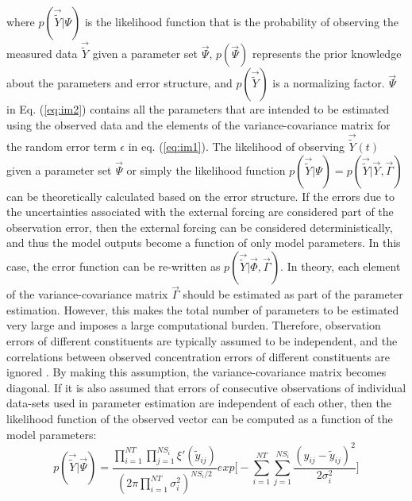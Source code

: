 where $p(\vec{\tilde Y}|\Psi)$ is the likelihood function that is the probability of observing the measured data $\vec{\tilde Y}$ given a parameter set $\vec{\Psi}$, $p(\vec{\Psi})$ represents the prior knowledge about the parameters and error structure, and $p(\vec{\tilde Y})$ is a normalizing factor. $\vec{\Psi}$ in Eq. (\ref{eq:im2}) contains all the parameters that are intended to be estimated using the observed data and the elements of the variance-covariance matrix for the random error term $\epsilon$ in eq. (\ref{eq:im1}). The likelihood of observing $\vec{\tilde Y}(t)$ given a parameter set $\vec{\Psi}$ or simply the likelihood function $p(\vec{\tilde Y}|\Psi) = p(\vec{\tilde Y}|\vec{Y},\vec{\Gamma})$ can be theoretically calculated based on the error structure. If the errors due to the uncertainties associated with the external forcing are considered part of the observation error, then the external forcing can be considered deterministically, and thus the model outputs become a function of only model parameters. In this case, the error function can be re-written as $p(\vec{\tilde Y}|\vec{\Phi},\vec{\Gamma})$. In theory, each element of the variance-covariance matrix $\vec{\Gamma}$ should be estimated as part of the parameter estimation. However, this makes the total number of parameters to be estimated very large and imposes a large computational burden. Therefore, observation errors of different constituents are typically assumed to be independent, and the correlations between observed concentration errors of different constituents are ignored \citep{walsh2012}. By making this assumption, the variance-covariance matrix becomes diagonal. If it is also assumed that errors of consecutive observations of individual data-sets used in parameter estimation are independent of each other, then the likelihood function of the observed vector can be computed as a function of the model parameters:
\begin{equation}
\label{eq:im3}
p(\vec{\tilde Y}|\vec{\Psi})=\frac{\prod_{i=1}^{NT} \prod_{j=1}^{NS_i} \xi'(\tilde y_{ij})}{(2 \pi \prod_{i=1}^{NT} \sigma_i^2)^{NS_i/2}}exp\bigg[-\sum_{i=1}^{NT} \sum_{j=1}^{NS_i} \frac{(y_{ij}-\tilde y_{ij})^2}{2 \sigma_i^2}\bigg]
\end{equation}

